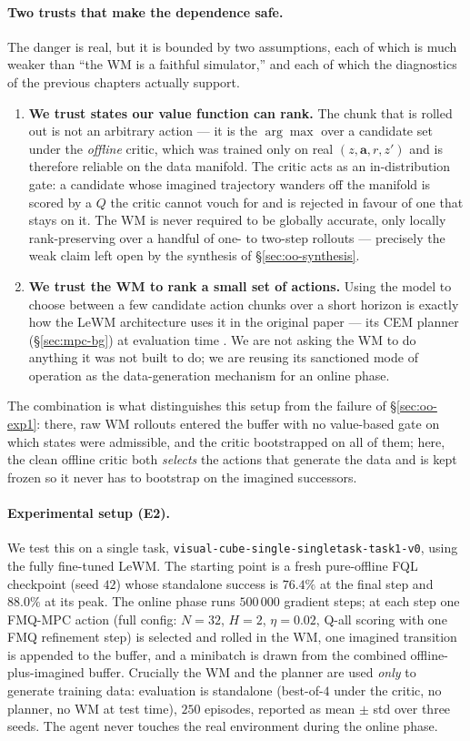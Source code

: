 \paragraph{Two trusts that make the dependence safe.} The danger is real, but it is bounded by two assumptions, each of which is much weaker than ``the WM is a faithful simulator,'' and each of which the diagnostics of the previous chapters actually support.
\begin{enumerate}
    \item \textbf{We trust states our value function can rank.} The chunk that is rolled out is not an arbitrary action --- it is the $\arg\max$ over a candidate set under the \emph{offline} critic, which was trained only on real $(z,\mathbf{a},r,z')$ and is therefore reliable on the data manifold. The critic acts as an in-distribution gate: a candidate whose imagined trajectory wanders off the manifold is scored by a $Q$ the critic cannot vouch for and is rejected in favour of one that stays on it. The WM is never required to be globally accurate, only locally rank-preserving over a handful of one- to two-step rollouts --- precisely the weak claim left open by the synthesis of \S\ref{sec:oo-synthesis}.
    \item \textbf{We trust the WM to rank a small set of actions.} Using the model to choose between a few candidate action chunks over a short horizon is exactly how the LeWM architecture uses it in the original paper --- its CEM planner (\S\ref{sec:mpc-bg}) at evaluation time \cite{maes2026leworldmodelstableendtoendjointembedding}. We are not asking the WM to do anything it was not built to do; we are reusing its sanctioned mode of operation as the data-generation mechanism for an online phase.
\end{enumerate}
The combination is what distinguishes this setup from the failure of \S\ref{sec:oo-exp1}: there, raw WM rollouts entered the buffer with no value-based gate on which states were admissible, and the critic bootstrapped on all of them; here, the clean offline critic both \emph{selects} the actions that generate the data and is kept frozen so it never has to bootstrap on the imagined successors.

\paragraph{Experimental setup (E2).} We test this on a single task, \texttt{visual-cube-single-singletask-task1-v0}, using the fully fine-tuned LeWM. The starting point is a fresh pure-offline FQL checkpoint (seed $42$) whose standalone success is $76.4\%$ at the final step and $88.0\%$ at its peak. The online phase runs $500\,000$ gradient steps; at each step one FMQ-MPC action (full config: $N = 32$, $H = 2$, $\eta = 0.02$, Q-all scoring with one FMQ refinement step) is selected and rolled in the WM, one imagined transition is appended to the buffer, and a minibatch is drawn from the combined offline-plus-imagined buffer. Crucially the WM and the planner are used \emph{only} to generate training data: evaluation is standalone (best-of-$4$ under the critic, no planner, no WM at test time), $250$ episodes, reported as mean $\pm$ std over three seeds. The agent never touches the real environment during the online phase.

